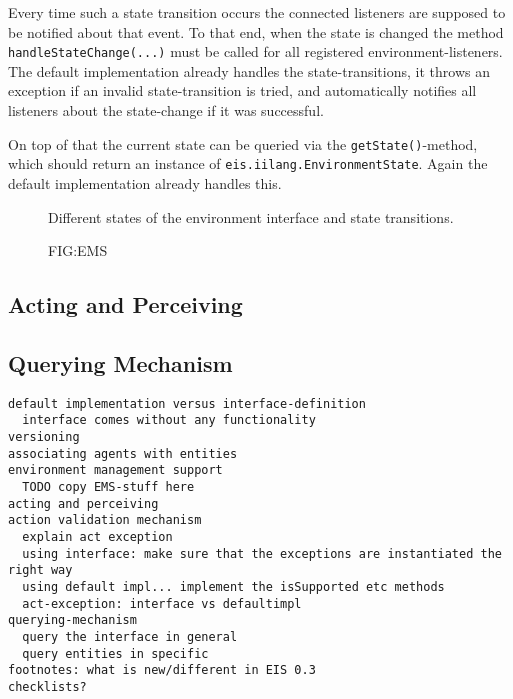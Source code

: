 \documentclass[a4]{article}
\begin{document}
Every time such a state transition occurs the connected listeners are supposed to be notified about that event. To that end, when the
state is changed the method  \texttt{handleStateChange(...)} must be called for all registered environment-listeners.
The default implementation already handles the state-transitions, it throws an exception if an invalid state-transition
is tried, and automatically notifies all listeners about the state-change if it was successful.

On top of that the current state can be queried via the \texttt{getState()}-method, which should return an instance of
\texttt{eis.iilang.EnvironmentState}. Again the default implementation already handles this.

\begin{figure}[h]\centering
{}
\caption{Different states of the environment interface and state transitions.}
\caption{FIG:EMS}
\end{figure}

\subsection{Acting and Perceiving}

\subsection{Querying Mechanism}

\begin{verbatim}
default implementation versus interface-definition
  interface comes without any functionality
versioning
associating agents with entities
environment management support
  TODO copy EMS-stuff here
acting and perceiving
action validation mechanism
  explain act exception
  using interface: make sure that the exceptions are instantiated the right way
  using default impl... implement the isSupported etc methods
  act-exception: interface vs defaultimpl
querying-mechanism
  query the interface in general
  query entities in specific
footnotes: what is new/different in EIS 0.3
checklists?
\end{verbatim}
\end{document}
